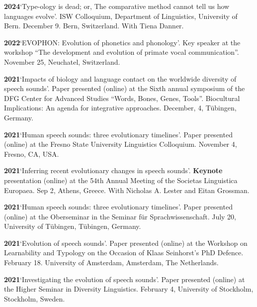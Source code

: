 \documentclass[11pt]{article}
\newcommand{\hangpara}{
 \setlength{\parindent}{0in} %
 \hangindent=0.42in %
}
\begin{document}
\vskip 6pt
\hangpara
{\bf 2024}\hspace{1ex}`Type-ology is dead; or, The comparative method cannot tell us how languages evolve'. ISW Colloquium, Department of Linguistics, University of Bern. December 9. Bern, Switzerland. With Tiena Danner.

\vskip 6pt
\hangpara
{\bf 2022}\hspace{1ex}`EVOPHON: Evolution of phonetics and phonology'. Key speaker at the workshop ``The development and evolution of primate vocal communication''. November 25, Neuchatel, Switzerland.

\vskip 6pt
\hangpara
{\bf 2021}\hspace{1ex}`Impacts of biology and language contact on the worldwide diversity of speech sounds'. Paper presented (online) at the Sixth annual symposium of the DFG Center for Advanced Studies ``Words, Bones, Genes, Tools''. Biocultural Implications: An agenda for integrative approaches. December, 4, Tübingen, Germany.

\vskip 6pt
\hangpara
{\bf 2021}\hspace{1ex}`Human speech sounds: three evolutionary timelines'. Paper presented (online) at the Fresno State University Linguistics Colloquium. November 4, Fresno, CA, USA.

\vskip 6pt
\hangpara
{\bf 2021}\hspace{1ex}`Inferring recent evolutionary changes in speech sounds'. \textbf{Keynote} presentation (online) at the 54th Annual Meeting of the Societas Linguistica Europaea. Sep 2, Athens, Greece. With Nicholas A. Lester and Eitan Grossman.

\vskip 6pt
\hangpara
{\bf 2021}\hspace{1ex}`Human speech sounds: three evolutionary timelines'. Paper presented (online) at the Oberseminar in the Seminar für Sprachwissenschaft. July 20, University of Tübingen, Tübingen, Germany.

\vskip 6pt
\hangpara
{\bf 2021}\hspace{1ex}`Evolution of speech sounds'. Paper presented (online) at the Workshop on Learnability and Typology
on the Occasion of Klaas Seinhorst’s PhD Defence. February 18. University of Amsterdam, Amsterdam, The Netherlands.

\vskip 6pt
\hangpara
{\bf 2021}\hspace{1ex}`Investigating the evolution of speech sounds'. Paper presented (online) at the Higher Seminar in Diversity Linguistics. February 4, University of Stockholm, Stockholm, Sweden.
\end{document}
